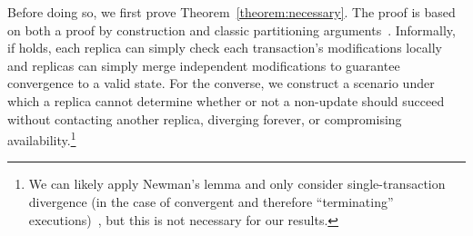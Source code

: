 Before doing so, we first prove Theorem~\ref{theorem:necessary}. The
proof is based on both a proof by construction and classic
partitioning arguments~\cite{gilbert-cap}. Informally, if \iconfluence
holds, each replica can simply check each transaction's modifications
locally and replicas can simply merge independent modifications to
guarantee convergence to a valid state. For the converse, we construct
a scenario under which a replica cannot determine whether or not a
non-\iconfluent update should succeed without contacting another
replica, diverging forever, or compromising availability.\footnote{We
  can likely apply Newman's lemma and only consider single-transaction
  divergence (in the case of convergent and therefore ``terminating''
  executions)~\cite{obs-confluence,termrewriting}, but this is not
  necessary for our results.}

